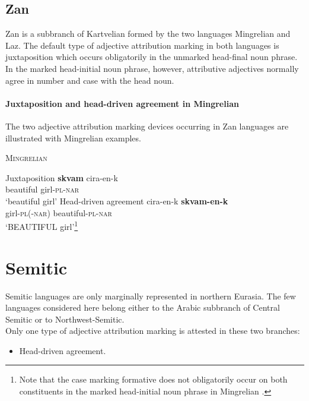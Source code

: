 \subsection{Zan}
Zan is a subbranch of Kartvelian formed by the two languages Mingrelian and Laz. The default type of adjective attribution marking in both languages is juxtaposition which occurs obligatorily in the unmarked head-final noun phrase. In the marked head-initial noun phrase, however, attributive adjectives normally agree in number and case with the head noun.

\paragraph{Juxtaposition and head-driven agreement in Mingrelian}
The two adjective attribution marking devices occurring in Zan languages are illustrated with Mingrelian examples.
\begin{exe}
\ex \textsc{Mingrelian} \citep[361–364]{harris1991b}
\begin{xlist}
\ex	Juxtaposition \label{mingrelian juxt}
\gll	\textbf{skvam} cira-en-k\\
	beautiful girl-\textsc{pl}-\textsc{nar}\\
\glt	‘beautiful girl’%
\ex 	Head-driven agreement \label{mingrelian agr}
\gll	cira-en-k \textbf{skvam-en-k}\\
	girl-\textsc{pl}(-\textsc{nar}) beautiful-\textsc{pl}-\textsc{nar}\\
\glt	‘BEAUTIFUL girl’\footnote{Note that the case marking formative does not obligatorily occur on both constituents in the marked head-initial noun phrase in Mingrelian \citep[363–364]{harris1991b}.}%
\end{xlist}
\end{exe}

\section{Semitic}
Semitic languages are only marginally represented in northern Eurasia. The few languages considered here belong either to the Arabic subbranch of Central Semitic or to Northwest-Semitic.\\

\noindent Only one type of adjective attribution marking is attested in these two branches:
\begin{itemize}
\item Head-driven agreement.
\end{itemize}

